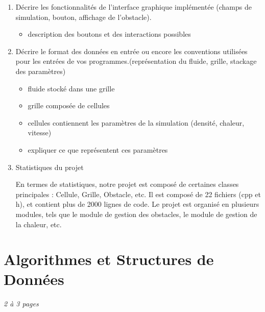 \documentclass[a4paper]{article}
\begin{document}
\begin{enumerate}
\begin{itemize}
{    $step = max(|i_1 - i_0|,|j_1 - j_0|)$. Lors ces étapes, nous parcourons, simplement toutes les cellules situées 
    entre les deux positions sélectionnées, en suivant le segment qui les relie. 
    Chaque cellule rencontrée reçoit la densité et la force, ce qui permet de créer une source linéaire.}
    \item calcul d'une simulation, le fluide, physique 
    \item PARTIE B : pas terminé
    \item bluetooth, lagrangien, musique, etc
\end{itemize}

\item Décrire les fonctionnalités de l'interface graphique implémentée (champs de simulation, bouton, affichage de l'obstacle).
\begin{itemize}
    \item description des boutons et des interactions possibles
\end{itemize}

\item Décrire le format des données en entrée ou encore les conventions utilisées pour les entrées de vos programmes.(représentation du fluide, grille, stackage des paramètres)
\begin{itemize}
    \item fluide stocké dans une grille
    \item grille composée de cellules
    \item cellules contiennent les paramètres de la simulation (densité, chaleur, vitesse)
    \item expliquer ce que représentent ces paramètres

\end{itemize}
\item Statistiques du projet

{\color{red}En termes de statistiques, notre projet est composé de certaines classes principales : Cellule, Grille, Obstacle, etc. Il est composé de 22 fichiers (cpp et h), 
et contient plus de 2000 lignes de code.
Le projet est organisé en plusieurs modules, tels que le module de gestion des obstacles, le module de gestion de la chaleur, etc.
}


\end{enumerate}

\section{Algorithmes et Structures de Données}
\emph{2 à 3 pages}
\end{document}
